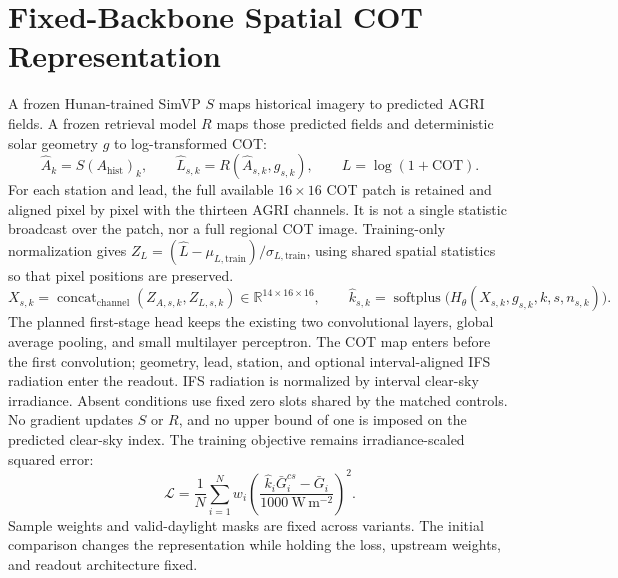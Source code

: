 \documentclass[11pt]{article}
\begin{document}
\section{Fixed-Backbone Spatial COT Representation}
A frozen Hunan-trained SimVP $S$ maps historical imagery to predicted AGRI fields. A frozen retrieval model $R$ maps those predicted fields and deterministic solar geometry $g$ to log-transformed COT:
\begin{equation}
\widehat A_k=S(A_{\mathrm{hist}})_k,\qquad
\widehat L_{s,k}=R(\widehat A_{s,k},g_{s,k}),\qquad L=\log(1+\mathrm{COT}).
\end{equation}
For each station and lead, the full available $16\times16$ COT patch is retained and aligned pixel by pixel with the thirteen AGRI channels. It is not a single statistic broadcast over the patch, nor a full regional COT image. Training-only normalization gives $Z_L=(\widehat L-\mu_{L,\mathrm{train}})/\sigma_{L,\mathrm{train}}$, using shared spatial statistics so that pixel positions are preserved.
\begin{equation}
X_{s,k}=\operatorname{concat}_{\mathrm{channel}}(Z_{A,s,k},Z_{L,s,k})
\in\mathbb R^{14\times16\times16},\qquad
\widehat k_{s,k}=\operatorname{softplus}\bigl(H_\theta(X_{s,k},g_{s,k},k,s,n_{s,k})\bigr).
\end{equation}
The planned first-stage head keeps the existing two convolutional layers, global average pooling, and small multilayer perceptron. The COT map enters before the first convolution; geometry, lead, station, and optional interval-aligned IFS radiation enter the readout. IFS radiation is normalized by interval clear-sky irradiance. Absent conditions use fixed zero slots shared by the matched controls. No gradient updates $S$ or $R$, and no upper bound of one is imposed on the predicted clear-sky index.
The training objective remains irradiance-scaled squared error:
\begin{equation}
\mathcal L=\frac{1}{N}\sum_{i=1}^{N}w_i
\left(\frac{\widehat k_i\bar G^{cs}_i-\bar G_i}{1000\ \mathrm{W\,m^{-2}}}\right)^2.
\end{equation}
Sample weights and valid-daylight masks are fixed across variants. The initial comparison changes the representation while holding the loss, upstream weights, and readout architecture fixed.
\end{document}
